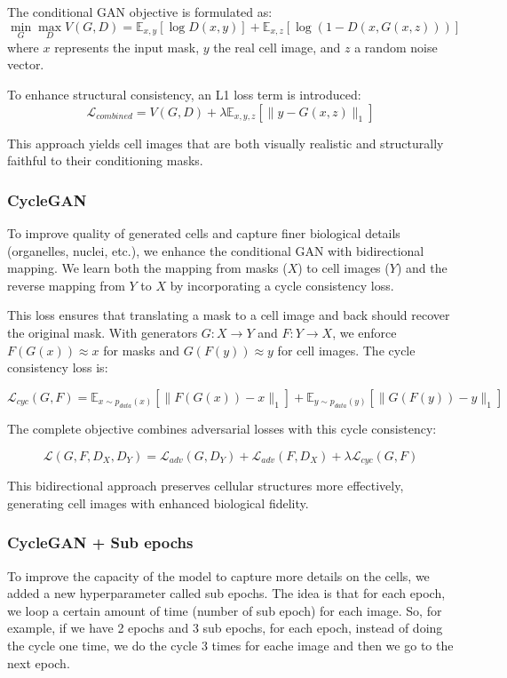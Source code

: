 \documentclass[]{article}
\begin{document}
The conditional GAN objective is formulated as:
\begin{equation}
\min_G \max_D V(G, D) = \mathbb{E}_{x,y}[\log D(x, y)] + \mathbb{E}_{x,z}[\log(1 - D(x, G(x, z)))]
\end{equation}
where $x$ represents the input mask, $y$ the real cell image, and $z$ a random noise vector.

To enhance structural consistency, an L1 loss term is introduced:
\begin{equation}
\mathcal{L}_{combined} = V(G, D) + \lambda \mathbb{E}_{x,y,z}[\|y - G(x, z)\|_1]
\end{equation}

This approach yields cell images that are both visually realistic and structurally faithful to their conditioning masks.
\subsubsection{CycleGAN}To improve quality of generated cells and capture finer biological details (organelles, nuclei, etc.), we enhance the conditional GAN with bidirectional mapping. We learn both the mapping from masks ($X$) to cell images ($Y$) and the reverse mapping from $Y$ to $X$ by incorporating a cycle consistency loss.

This loss ensures that translating a mask to a cell image and back should recover the original mask. With generators $G: X \rightarrow Y$ and $F: Y \rightarrow X$, we enforce $F(G(x)) \approx x$ for masks and $G(F(y)) \approx y$ for cell images. The cycle consistency loss is:

$$\mathcal{L}_{cyc}(G, F) = \mathbb{E}_{x \sim p_{data}(x)}[\|F(G(x)) - x\|_1] + \mathbb{E}_{y \sim p_{data}(y)}[\|G(F(y)) - y\|_1]$$

The complete objective combines adversarial losses with this cycle consistency:

$$\mathcal{L}(G, F, D_X, D_Y) = \mathcal{L}_{adv}(G, D_Y) + \mathcal{L}_{adv}(F, D_X) + \lambda \mathcal{L}_{cyc}(G, F)$$

This bidirectional approach preserves cellular structures more effectively, generating cell images with enhanced biological fidelity.
\subsubsection{CycleGAN + Sub epochs}
To improve the capacity of the model to capture more details on the cells, we added a new hyperparameter called sub epochs. The idea is that for each epoch, we loop a certain amount of time (number of sub epoch) for each image. So, for example, if we have 2 epochs and 3 sub epochs, for each epoch, instead of doing the cycle one time, we do the cycle 3 times for eache image and then we go to the next  epoch.
\end{document}
